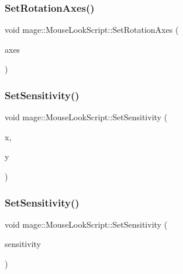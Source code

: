 \hypertarget{classmage_1_1_mouse_look_script_a4a1818161f8bc245399cf3b77ff41b53}{}\label{classmage_1_1_mouse_look_script_a4a1818161f8bc245399cf3b77ff41b53} 
\subsubsection{\texorpdfstring{Set\+Rotation\+Axes()}{SetRotationAxes()}}
{\footnotesize\ttfamily void mage\+::\+Mouse\+Look\+Script\+::\+Set\+Rotation\+Axes (\begin{DoxyParamCaption}\item[{\hyperlink{namespacemage_a548e5c31b08a1078841ed21948f5bf4c}{Rotation\+Axes}}]{axes }\end{DoxyParamCaption})}

\hypertarget{classmage_1_1_mouse_look_script_ac53d16f789083f4d3fd43c0e75db8776}{}\label{classmage_1_1_mouse_look_script_ac53d16f789083f4d3fd43c0e75db8776} 
\subsubsection{\texorpdfstring{Set\+Sensitivity()}{SetSensitivity()}\hspace{0.1cm}{\footnotesize\ttfamily [1/3]}}
{\footnotesize\ttfamily void mage\+::\+Mouse\+Look\+Script\+::\+Set\+Sensitivity (\begin{DoxyParamCaption}\item[{float}]{x,  }\item[{float}]{y }\end{DoxyParamCaption})}

\hypertarget{classmage_1_1_mouse_look_script_afb4e47a84781a03d51ba4c509c7dce41}{}\label{classmage_1_1_mouse_look_script_afb4e47a84781a03d51ba4c509c7dce41} 
\subsubsection{\texorpdfstring{Set\+Sensitivity()}{SetSensitivity()}\hspace{0.1cm}{\footnotesize\ttfamily [2/3]}}
{\footnotesize\ttfamily void mage\+::\+Mouse\+Look\+Script\+::\+Set\+Sensitivity (\begin{DoxyParamCaption}\item[{const X\+M\+F\+L\+O\+A\+T2 \&}]{sensitivity }\end{DoxyParamCaption})}


